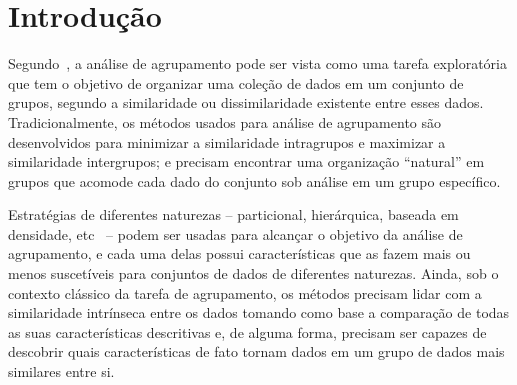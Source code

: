 \documentclass[
    12pt,                %
    oneside,            %
    a4paper,            %
    english,            %
    brazil                %
    ]{abntex2ppgsi}
\begin{document}

\chapter{Introdução}
\label{cap:intro}




Segundo~, a análise de agrupamento pode ser vista como uma tarefa exploratória que tem o objetivo de organizar uma coleção de dados em um conjunto de grupos, segundo a similaridade ou dissimilaridade existente entre esses dados.
Tradicionalmente, os métodos usados para análise de agrupamento são desenvolvidos para minimizar a similaridade intragrupos e maximizar a similaridade intergrupos; e precisam encontrar uma organização ``natural'' em grupos que acomode cada dado do conjunto sob análise em um grupo específico.

Estratégias de diferentes naturezas -- particional, hierárquica, baseada em densidade, etc~\cite{Han2011,Xu2005} -- podem ser usadas para alcançar o objetivo da análise de agrupamento, e cada uma delas possui características que as fazem mais ou menos suscetíveis para conjuntos de dados de diferentes naturezas.
Ainda, sob o contexto clássico da tarefa de agrupamento, os métodos precisam lidar com a similaridade intrínseca entre os dados tomando como base a comparação de todas as suas características descritivas e, de alguma forma, precisam ser capazes de descobrir quais características de fato tornam dados em um grupo de dados mais similares entre si.
\end{document}
